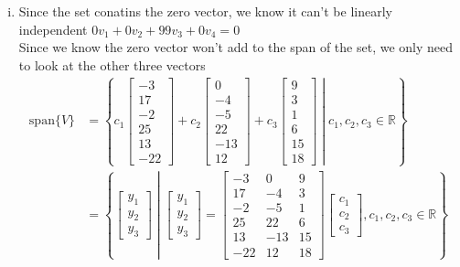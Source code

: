 \documentclass{article}
\begin{document}
\begin{enumerate}[(i)]
    Then \(\vec{y}\) could be any vector in \(\mathbb{R}^4\), i.e. the set spans \(\mathbb{R}^4 \)
    \\

    Since the vectors are linearly independent and also span \(\mathbb{R}^4\), 
    they also form a basis for \(\mathbb{R}^4\).


    \item Since the set conatins the zero vector, we know it can't be linearly independent
    \(0v_1 + 0v_2 + 99v_3 + 0v_4 = 0\)
    \\

    Since we know the zero vector won't add to the span of the set, we only need to look at the other three vectors
    \begin{align*}
        \text{span}\{{V}\} &= \left\{c_1\begin{bmatrix}
        -3\\17\\-2\\25\\13\\-22
        \end{bmatrix} + c_2\begin{bmatrix}
        0\\-4\\-5\\22\\-13\\12
        \end{bmatrix} + c_3\begin{bmatrix}
        9\\3\\1\\6\\15\\18
        \end{bmatrix} \middle| c_1,c_2,c_3 \in \mathbb{R}\right\}
        \\
        & = \left\{\begin{bmatrix}
        y_1\\y_2\\y_3
        \end{bmatrix} \middle| \begin{bmatrix}
        y_1\\y_2\\y_3
        \end{bmatrix} = \begin{bmatrix}
        -3&0&9\\
        17&-4&3 \\
        -2&-5&1 \\
        25&22&6 \\
        13&-13&15 \\
        -22&12&18
        \end{bmatrix}\begin{bmatrix}
        c_1\\c_2\\c_3
        \end{bmatrix}, c_1,c_2,c_3 \in \mathbb{R}\right\}
    \end{align*}


\end{enumerate}
\end{document}
